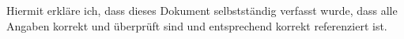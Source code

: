 
Hiermit erkläre ich, dass dieses Dokument selbstständig verfasst wurde, dass alle Angaben korrekt
und überprüft sind und entsprechend korrekt referenziert ist.\newline\newline
\gitAuthorDate \gitAuthorName